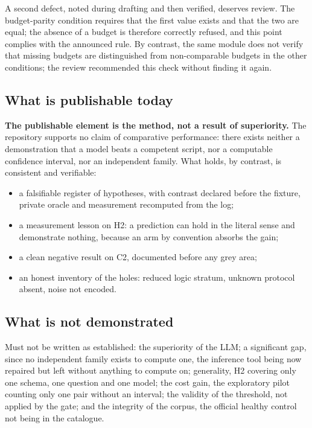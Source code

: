A second defect, noted during drafting and then verified, deserves review. The
budget-parity condition requires that the first value exists and that the two are
equal; the absence of a budget is therefore correctly refused, and this point
complies with the announced rule. By contrast, the same module does not verify that
missing budgets are distinguished from non-comparable budgets in the other
conditions; the review recommended this check without finding it again.

\subsection{What is publishable today}

\textbf{The publishable element is the method, not a result of superiority.} The
repository supports no claim of comparative performance: there exists neither a
demonstration that a model beats a competent script, nor a computable confidence
interval, nor an independent family. What holds, by contrast, is consistent and
verifiable:

\begin{itemize}
\item a falsifiable register of hypotheses, with contrast declared before the
fixture, private oracle and measurement recomputed from the log;
\item a measurement lesson on H2: a prediction can hold in the literal sense and
demonstrate nothing, because an arm by convention absorbs the gain;
\item a clean negative result on C2, documented before any grey area;
\item an honest inventory of the holes: reduced logic stratum, unknown protocol
absent, noise not encoded.
\end{itemize}

\subsection{What is not demonstrated}

Must not be written as established: the superiority of the LLM; a significant gap,
since no independent family exists to compute one, the inference tool being now
repaired but left without anything to compute on; generality, H2 covering only one
schema, one question and one model; the cost gain, the exploratory pilot counting only one pair without an
interval; the validity of the threshold, not applied by the gate; and the integrity
of the corpus, the official healthy control not being in the catalogue.

